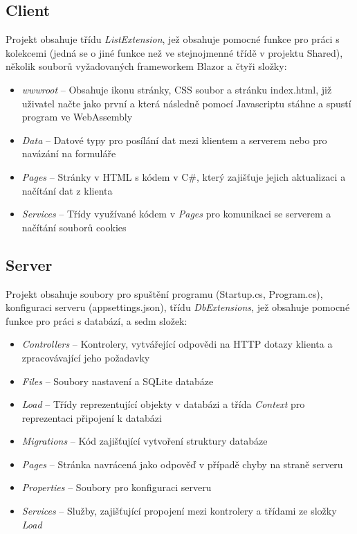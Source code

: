 \documentclass[a4paper,12pt]{article}
\begin{document}
\subsection{Client}
Projekt obsahuje třídu \textit{ListExtension}, jež obsahuje pomocné funkce pro práci s kolekcemi (jedná se o jiné funkce než ve stejnojmenné třídě v projektu Shared), několik souborů vyžadovaných frameworkem Blazor a čtyři složky:
\begin{itemize}
\item\textit{wwwroot} -- Obsahuje ikonu stránky, CSS soubor a stránku index.html, již uživatel načte jako první a která následně pomocí Javascriptu stáhne a spustí program ve WebAssembly
\item\textit{Data} -- Datové typy pro posílání dat mezi klientem a serverem nebo pro navázání na formuláře
\item\textit{Pages} -- Stránky v HTML s kódem v C\#, který zajišťuje jejich aktualizaci a načítání dat z klienta
\item\textit{Services} -- Třídy využívané kódem v \textit{Pages} pro komunikaci se serverem a načítání souborů cookies
\end{itemize}
\subsection{Server}
Projekt obsahuje soubory pro spuštění programu (Startup.cs, Program.cs), konfiguraci serveru (appsettings.json), třídu \textit{DbExtensions}, jež obsahuje pomocné funkce pro práci s databází, a sedm složek:
\begin{itemize}
\item\textit{Controllers} -- Kontrolery, vytvářející odpovědi na HTTP dotazy klienta a zpracovávající jeho požadavky
\item\textit{Files} -- Soubory nastavení a SQLite databáze
\item\textit{Load} -- Třídy reprezentující objekty v databázi a třída \textit{Context} pro reprezentaci připojení k databázi
\item\textit{Migrations} -- Kód zajišťující vytvoření struktury databáze
\item\textit{Pages} -- Stránka navrácená jako odpověď v případě chyby na straně serveru
\item\textit{Properties} -- Soubory pro konfiguraci serveru
\item\textit{Services} -- Služby, zajišťující propojení mezi kontrolery a třídami ze složky \textit{Load}
\end{itemize}
\newpage
\printbibliography[heading=bibintoc, title={Použitá literatura}]
\end{document}
